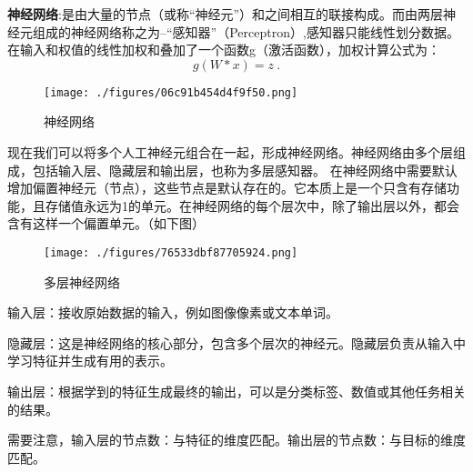 \textbf{神经网络}:是由大量的节点（或称“神经元”）和之间相互的联接构成。而由两层神经元组成的神经网络称之为--“感知器”（Perceptron）,感知器只能线性划分数据。在输入和权值的线性加权和叠加了一个函数g（激活函数），加权计算公式为：
\begin{equation}
g(W * x) = z~.
\end{equation}
\begin{figure}[ht]
\centering
\texttt{[image: ./figures/06c91b454d4f9f50.png]}
\caption{神经网络} \label{fig_CNN1_4}
\end{figure}
现在我们可以将多个人工神经元组合在一起，形成神经网络。神经网络由多个层组成，包括输入层、隐藏层和输出层，也称为多层感知器。
在神经网络中需要默认增加偏置神经元（节点），这些节点是默认存在的。它本质上是一个只含有存储功能，且存储值永远为1的单元。在神经网络的每个层次中，除了输出层以外，都会含有这样一个偏置单元。（如下图）\begin{figure}[ht]
\centering
\texttt{[image: ./figures/76533dbf87705924.png]}
\caption{多层神经网络} \label{fig_CNN1_5}
\end{figure}
输入层：接收原始数据的输入，例如图像像素或文本单词。

隐藏层：这是神经网络的核心部分，包含多个层次的神经元。隐藏层负责从输入中学习特征并生成有用的表示。

输出层：根据学到的特征生成最终的输出，可以是分类标签、数值或其他任务相关的结果。

需要注意，输入层的节点数：与特征的维度匹配。输出层的节点数：与目标的维度匹配。


